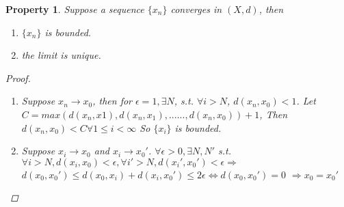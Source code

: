 \documentclass{article}
\newtheorem*{property}{Property}
\begin{document}
\begin{property}
Suppose a sequence $\{x_n\}$ converges in $(X, d)$, then
\begin{enumerate}
    \item $\{x_n\}$ is bounded.
    \item the limit is unique.
\end{enumerate}
\begin{proof} \hfill
    \begin{enumerate}
        \item Suppose $x_n \rightarrow x_0$, then for $\epsilon = 1, \exists N$, 
        s.t. $\forall i > N$, $d(x_n, x_0) < 1$.
        Let $C = max(d(x_n, x1), d(x_n, x_1),......,d(x_n, x_0)) + 1$,
        Then $d(x_n, x_0) < C \forall 1 \le i < \infty$
        So $\{x_i\}$ is bounded.
        \item Suppose $x_i \rightarrow x_0$ and $x_i \rightarrow x_0'$.
        $\forall \epsilon > 0, \exists N, N'$ s.t.
        $\forall i > N, d(x_i, x_0) < \epsilon, \forall i' > N, d(x_i', x_0') < \epsilon \Rightarrow$
        $d(x_0, x_0') \le d(x_0, x_i) + d(x_i, x_0') \le 2\epsilon \Leftrightarrow d(x_0, x_0') = 0$
        $\Rightarrow x_0 = x_0'$
    \end{enumerate}
\end{proof}
\end{property}
\end{document}
